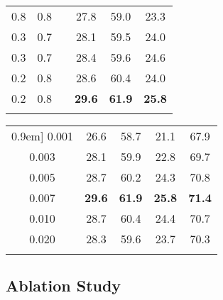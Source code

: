 \documentclass[final]{cvpr}
\newcommand{\xmark}{\text{\ding{55}}}
\newcommand{\cmark}{\text{\ding{51}}}
\begin{document}
\begin{figure*}[t]
\begin{table*}[t]
\begin{minipage}{0.34\linewidth}
{\begin{tabular}{c@{\hskip 0.15in}c@{\hskip 0.15in}c@{\hskip 0.2in}c@{\hskip 0.13in}c@{\hskip 0.09in}c}
  0.8&0.8  &   \xmark    &  27.8     & 59.0      &  23.3 \\
    0.3   & 0.7   &    \xmark   &    28.1   &  59.5     & 24.0 \\
    0.3   & 0.7   &   \textcolor{red}{\cmark}    &  28.4   &    59.6  &  24.6  \\
    0.2   & 0.8   &    \xmark   &   28.6    &   60.4    & 24.0 \\
    0.2   & 0.8   &   \textcolor{red}{\cmark}    &  \textbf{29.6}     &  \textbf{61.9}     & \textbf{25.8} \\
    \Xhline{1pt}
    \end{tabular}}
    \vspace{-0.7em}
      \caption{Analysis of thresholds  and , and effect of the growing technique .}
  \label{table_params}\end{minipage}\hfill
\begin{minipage}{0.32\linewidth}
\centering
{
    \begin{tabular}{c@{\hskip 0.17in}c@{\hskip 0.13in}c@{\hskip 0.1in}c@{\hskip 0.1in}c}
    \Xhline{1pt}\-0.9em]
         0.001   &  26.6    &  58.7    &    21.1  &  67.9 \\
     0.003  &   28.1   &    59.9  & 22.8    &  69.7\\
     0.005    &   28.7   &   60.2    &   24.3    &  70.8 \\
     0.007   &  \textbf{29.6}     &      \textbf{61.9} &  \textbf{25.8}     &  \textbf{71.4}\\
     0.010   &  28.7    & 60.4     &     24.4  &  70.7 \\ 
     0.020   &   28.3   &    59.6  &     23.7  & 70.3 \\

    \Xhline{1pt}
    \end{tabular}}
    \vspace{-0.7em}
      \caption{Effect of  on instance (\texttt{Ins.}) and semantic (\texttt{Sem.}) segmentation.}\label{table_lambda}\end{minipage}
\vspace{-1.2em}
\end{table*} 
\vspace{-0.1em}
\subsection{Ablation Study}
\vspace{-0.1em}


\end{figure*}
\end{document}

